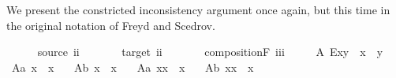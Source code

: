 \begin{isabellebody}
%
\endisatagproof
{\isafoldproof}%
%
\isadelimproof
%
\endisadelimproof
%
\begin{isamarkuptext}%
We present the constricted inconsistency argument once again, but this time in the original
  notation of Freyd and Scedrov.%
\end{isamarkuptext}\isamarkuptrue%
\isamarkupfalse%
\ \ \isanewline
\ \ \ source{\isacharcolon}{\isacharcolon}\ {\isachardoublequoteopen}i{\isasymRightarrow}i{\isachardoublequoteclose}\ {\isacharparenleft}{\isachardoublequoteopen}{\isasymbox}{\isacharunderscore}{\isachardoublequoteclose}\ {\isacharbrackleft}{}{}{}{\isacharbrackright}\ {}{}{}{\isacharparenright}\ \isanewline
\ \ \ target{\isacharcolon}{\isacharcolon}\ {\isachardoublequoteopen}i{\isasymRightarrow}i{\isachardoublequoteclose}\ {\isacharparenleft}{\isachardoublequoteopen}{\isacharunderscore}{\isasymbox}{\isachardoublequoteclose}\ {\isacharbrackleft}{}{}{}{\isacharbrackright}\ {}{}{}{\isacharparenright}\ \isanewline
\ \ \ compositionF{\isacharcolon}{\isacharcolon}\ {\isachardoublequoteopen}i{\isasymRightarrow}i{\isasymRightarrow}i{\isachardoublequoteclose}\ {\isacharparenleft}\ {\isachardoublequoteopen}\isactrlbold {\isasymcdot}{\isachardoublequoteclose}\ {}{}{}{\isacharparenright}\isanewline
\isanewline
\ \ A{}{\isacharcolon}\ {\isachardoublequoteopen}E{\isacharparenleft}x\isactrlbold {\isasymcdot}y{\isacharparenright}\ \isactrlbold {\isasymleftrightarrow}\ {\isacharparenleft}x{\isasymbox}\ {\isasymcong}\ {\isasymbox}y{\isacharparenright}{\isachardoublequoteclose}\ \ \isanewline
\ A{}a{\isacharcolon}\ {\isachardoublequoteopen}{\isacharparenleft}{\isacharparenleft}{\isasymbox}x{\isacharparenright}{\isasymbox}{\isacharparenright}\ {\isasymcong}\ {\isasymbox}x{\isachardoublequoteclose}\ \ \isanewline
\ A{}b{\isacharcolon}\ {\isachardoublequoteopen}{\isasymbox}{\isacharparenleft}x{\isasymbox}{\isacharparenright}\ {\isasymcong}\ {\isasymbox}x{\isachardoublequoteclose}\ \ \isanewline
\ A{}a{\isacharcolon}\ {\isachardoublequoteopen}{\isacharparenleft}{\isasymbox}x{\isacharparenright}\isactrlbold {\isasymcdot}x\ {\isasymcong}\ x{\isachardoublequoteclose}\ \ \isanewline
\ A{}b{\isacharcolon}\ {\isachardoublequoteopen}x\isactrlbold {\isasymcdot}{\isacharparenleft}x{\isasymbox}{\isacharparenright}\ {\isasymcong}\ x{\isachardoublequoteclose}\ \ \isanewline

\end{isabellebody}
